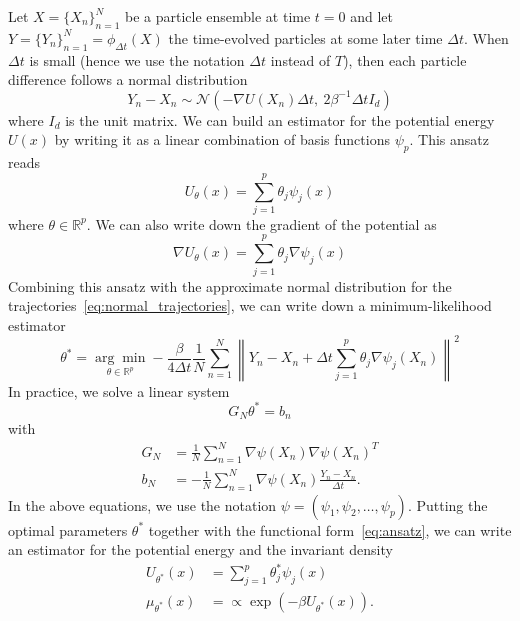 \documentclass{article}
\newcommand{\norm}[1]{\left\lVert #1 \right\rVert}
\begin{document}
Let $X = \{X_n\}_{n=1}^N$ be a particle ensemble at time $t = 0$ and let $Y = \{Y_n\}_{n=1}^N = \phi_{\Delta t}(X)$ the time-evolved particles at some later time $\Delta t$. When $\Delta t$ is small (hence we use the notation $\Delta t$ instead of $T$), then each particle difference follows a normal distribution
\begin{equation} \label{eq:normal_trajectories}
    Y_n - X_n \sim \mathcal{N}\left(-\nabla U(X_n) \Delta t, \ 2 \beta^{-1} \Delta t I_d \right)
\end{equation}
where $I_d$ is the unit matrix. We can build an estimator for the potential energy $U(x)$ by writing it as a linear combination of basis functions $\psi_p$. This ansatz reads
\begin{equation} \label{eq:ansatz}
    U_\theta(x) = \sum_{j=1}^p \theta_j \psi_j(x)
\end{equation}
where $\theta \in \mathbb{R}^p$. We can also write down the gradient of the potential as
\begin{equation}
    \nabla U_\theta(x) = \sum_{j=1}^p \theta_j \nabla \psi_j(x)
\end{equation}
Combining this ansatz with the approximate normal distribution for the trajectories~\eqref{eq:normal_trajectories}, we can write down a minimum-likelihood estimator
\begin{equation}
    \theta^* = \underset{\theta \in \mathbb{R}^p}{\arg \min} - \frac{\beta}{4 \Delta t}\frac{1}{N} \sum_{n=1}^N \norm{Y_n - X_n + \Delta t \sum_{j=1}^p \theta_j \nabla \psi_j(X_n) }^2
\end{equation}
In practice, we solve a linear system
\begin{equation}
    G_N \theta^* = b_n
\end{equation}
with
\begin{align*}
    G_N &= \frac{1}{N} \sum_{n=1}^N \nabla \psi(X_n) \nabla \psi(X_n)^T \\
    b_N &= -\frac{1}{N} \sum_{n=1}^N \nabla \psi(X_n) \frac{Y_n - X_n}{\Delta t}.
\end{align*}
In the above equations, we use the notation $\psi = \left(\psi_1, \psi_2, \dots, \psi_p\right)$. Putting the optimal parameters $\theta^*$ together with the functional form~\eqref{eq:ansatz}, we can write an estimator for the potential energy and the invariant density
\begin{align*}
    U_{\theta^*}(x) &= \sum_{j=1}^p \theta^*_j \psi_j(x) \\
    \mu_{\theta^*}(x) &= \propto \exp\left(-\beta U_{\theta^*}(x)\right).
\end{align*}
\end{document}
